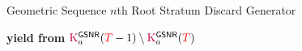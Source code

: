 \begin{algorithm}
\caption{Geometric Sequence $n$th Root Stratum Discard Generator}
\label{alg:geom-seq-nth-root-gen-drop-ranks}
\begin{algorithmic}[1]
    \Ensure{ $\colorTbar \in [0 \twodots \colorT)$ -- data items to drop, if any } 
      \State \textbf{yield from} $\colorK^{\mathsf{GSNR}}_a(\colorT - 1) \setminus \colorK^{\mathsf{GSNR}}_a(\colorT)$
    \EndIf
\end{algorithmic}
\end{algorithm}
